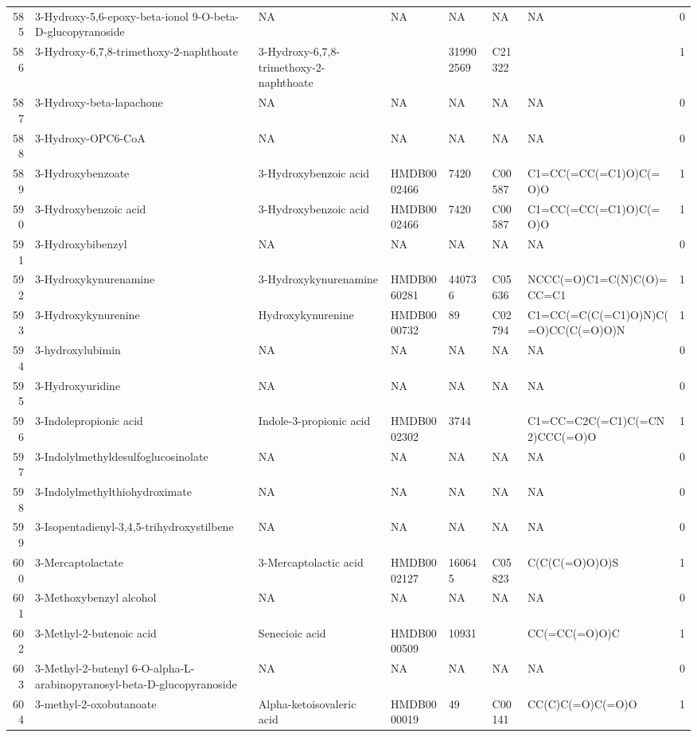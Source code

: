 \documentclass[a4paper]{article}
\begin{document}
\begin{longtable}{rlllllll}
  585 & 3-Hydroxy-5,6-epoxy-beta-ionol 9-O-beta-D-glucopyranoside & NA & NA & NA & NA & NA & 0 \\ 
  586 & 3-Hydroxy-6,7,8-trimethoxy-2-naphthoate & 3-Hydroxy-6,7,8-trimethoxy-2-naphthoate &  & 319902569 & C21322 &  & 1 \\ 
  587 & 3-Hydroxy-beta-lapachone & NA & NA & NA & NA & NA & 0 \\ 
  588 & 3-Hydroxy-OPC6-CoA & NA & NA & NA & NA & NA & 0 \\ 
  589 & 3-Hydroxybenzoate & 3-Hydroxybenzoic acid & HMDB0002466 & 7420 & C00587 & C1=CC(=CC(=C1)O)C(=O)O & 1 \\ 
  590 & 3-Hydroxybenzoic acid & 3-Hydroxybenzoic acid & HMDB0002466 & 7420 & C00587 & C1=CC(=CC(=C1)O)C(=O)O & 1 \\ 
  591 & 3-Hydroxybibenzyl & NA & NA & NA & NA & NA & 0 \\ 
  592 & 3-Hydroxykynurenamine & 3-Hydroxykynurenamine & HMDB0060281 & 440736 & C05636 & NCCC(=O)C1=C(N)C(O)=CC=C1 & 1 \\ 
  593 & 3-Hydroxykynurenine & Hydroxykynurenine & HMDB0000732 & 89 & C02794 & C1=CC(=C(C(=C1)O)N)C(=O)CC(C(=O)O)N & 1 \\ 
  594 & 3-hydroxylubimin & NA & NA & NA & NA & NA & 0 \\ 
  595 & 3-Hydroxyuridine & NA & NA & NA & NA & NA & 0 \\ 
  596 & 3-Indolepropionic acid & Indole-3-propionic acid & HMDB0002302 & 3744 &  & C1=CC=C2C(=C1)C(=CN2)CCC(=O)O & 1 \\ 
  597 & 3-Indolylmethyldesulfoglucosinolate & NA & NA & NA & NA & NA & 0 \\ 
  598 & 3-Indolylmethylthiohydroximate & NA & NA & NA & NA & NA & 0 \\ 
  599 & 3-Isopentadienyl-3,4,5-trihydroxystilbene & NA & NA & NA & NA & NA & 0 \\ 
  600 & 3-Mercaptolactate & 3-Mercaptolactic acid & HMDB0002127 & 160645 & C05823 & C(C(C(=O)O)O)S & 1 \\ 
  601 & 3-Methoxybenzyl alcohol & NA & NA & NA & NA & NA & 0 \\ 
  602 & 3-Methyl-2-butenoic acid & Senecioic acid & HMDB0000509 & 10931 &  & CC(=CC(=O)O)C & 1 \\ 
  603 & 3-Methyl-2-butenyl 6-O-alpha-L-arabinopyranosyl-beta-D-glucopyranoside & NA & NA & NA & NA & NA & 0 \\ 
  604 & 3-methyl-2-oxobutanoate & Alpha-ketoisovaleric acid & HMDB0000019 & 49 & C00141 & CC(C)C(=O)C(=O)O & 1 \\ 

\end{longtable}
\end{document}
